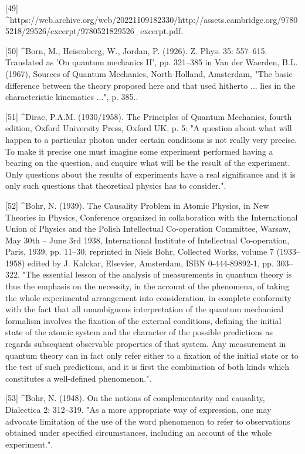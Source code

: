 [49]
^https://web.archive.org/web/20221109182330/http://assets.cambridge.org/97805218/29526/excerpt/9780521829526_excerpt.pdf.

[50]
^Born, M., Heisenberg, W., Jordan, P. (1926). Z. Phys. 35: 557–615. Translated as 'On quantum mechanics II', pp. 321–385 in Van der Waerden, B.L. (1967), Sources of Quantum Mechanics, North-Holland, Amsterdam, "The basic difference between the theory proposed here and that used hitherto ... lies in the characteristic kinematics ...", p. 385..

[51]
^Dirac, P.A.M. (1930/1958). The Principles of Quantum Mechanics, fourth edition, Oxford University Press, Oxford UK, p. 5: "A question about what will happen to a particular photon under certain conditions is not really very precise. To make it precise one must imagine some experiment performed having a bearing on the question, and enquire what will be the result of the experiment. Only questions about the results of experiments have a real significance and it is only such questions that theoretical physics has to consider.".

[52]
^Bohr, N. (1939). The Causality Problem in Atomic Physics, in New Theories in Physics, Conference organized in collaboration with the International Union of Physics and the Polish Intellectual Co-operation Committee, Warsaw, May 30th – June 3rd 1938, International Institute of Intellectual Co-operation, Paris, 1939, pp. 11–30, reprinted in Niels Bohr, Collected Works, volume 7 (1933–1958) edited by J. Kalckar, Elsevier, Amsterdam, ISBN 0-444-89892-1, pp. 303–322. "The essential lesson of the analysis of measurements in quantum theory is thus the emphasis on the necessity, in the account of the phenomena, of taking the whole experimental arrangement into consideration, in complete conformity with the fact that all unambiguous interpretation of the quantum mechanical formalism involves the fixation of the external conditions, defining the initial state of the atomic system and the character of the possible predictions as regards subsequent observable properties of that system. Any measurement in quantum theory can in fact only refer either to a fixation of the initial state or to the test of such predictions, and it is first the combination of both kinds which constitutes a well-defined phenomenon.".

[53]
^Bohr, N. (1948). On the notions of complementarity and causality, Dialectica 2: 312–319. "As a more appropriate way of expression, one may advocate limitation of the use of the word phenomenon to refer to observations obtained under specified circumstances, including an account of the whole experiment.".

